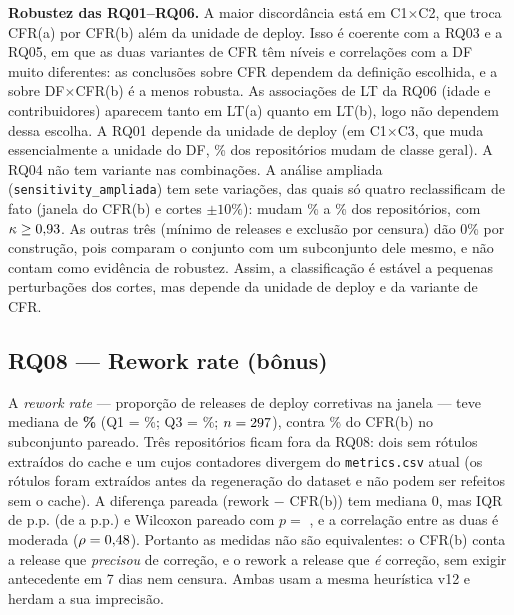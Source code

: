 \textbf{Robustez das RQ01--RQ06.} A maior discordância está em C1$\times$C2, que troca CFR(a) por CFR(b) além da
unidade de deploy. Isso é coerente com a RQ03 e a RQ05, em que as duas variantes de CFR têm níveis e
correlações com a DF muito diferentes: as conclusões sobre CFR dependem da definição escolhida, e a sobre
DF$\times$CFR(b) é a menos robusta. As associações de LT da RQ06 (idade e contribuidores) aparecem tanto em LT(a)
quanto em LT(b), logo não dependem dessa escolha. A RQ01 depende da unidade de deploy (em C1$\times$C3, que muda
essencialmente a unidade do DF, \NSensUmTresPct\% dos repositórios mudam de classe geral). A RQ04 não tem
variante nas combinações. A análise ampliada (\texttt{sensitivity\_ampliada}) tem sete variações, das quais só quatro
reclassificam de fato (janela do CFR(b) e cortes $\pm 10\%$): mudam \NAmpInfMinPct\% a \NAmpInfMaxPct\% dos
repositórios, com $\kappa \geq 0{,}93$. As outras três (mínimo de releases e exclusão por censura) dão
0\% por construção, pois comparam o conjunto com um subconjunto dele mesmo, e não contam como evidência de
robustez. Assim, a classificação é estável a pequenas perturbações dos cortes, mas depende da unidade de deploy
e da variante de CFR.

\subsection{RQ08 --- Rework rate (bônus)}

A \textit{rework rate} --- proporção de releases de deploy corretivas na janela --- teve mediana de
\textbf{\NRwMed\%} (Q1 = \NRwQum\%; Q3 = \NRwQtres\%; $n = 297$), contra \NRwCfrbMed\% do CFR(b) no
subconjunto pareado. Três repositórios ficam fora da RQ08: dois sem rótulos extraídos do cache e um cujos
contadores divergem do \texttt{metrics.csv} atual (os rótulos foram extraídos antes da regeneração do dataset
e não podem ser refeitos sem o cache). A diferença pareada (rework $-$ CFR(b)) tem mediana 0, mas IQR de
\NRwDifIqr{} p.p. (de \NRwDifQum{} a \NRwDifQtres{} p.p.) e Wilcoxon pareado com $p = $ \NRwWilcoxonP, e a
correlação entre as duas é moderada ($\rho = 0{,}48$). Portanto as medidas não são equivalentes: o CFR(b)
conta a release que \emph{precisou} de correção, e o rework a release que \emph{é} correção, sem exigir antecedente
em 7 dias nem censura. Ambas usam a mesma heurística v12 e herdam a sua imprecisão.
